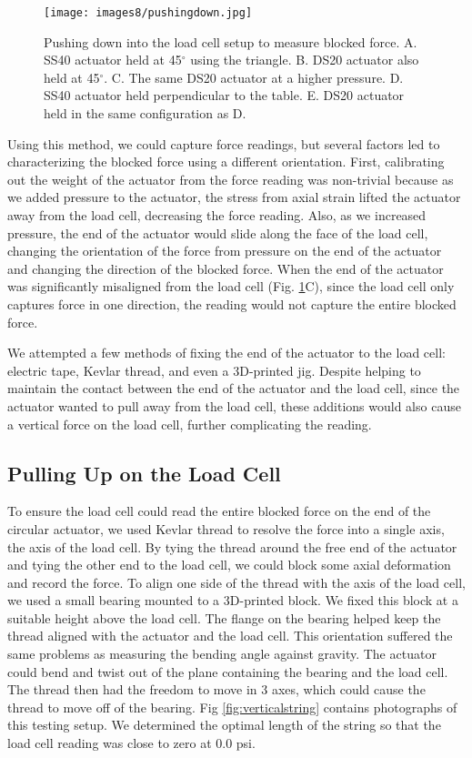 \begin{figure}[ht]
    \centering
     \texttt{[image: images8/pushingdown.jpg]}
    \caption{Pushing down into the load cell setup to measure blocked force. A. SS40 actuator held at 45$^\circ$ using the triangle. B. DS20 actuator also held at 45$^\circ$. C. The same DS20 actuator at a higher pressure. D. SS40 actuator held perpendicular to the table. E. DS20 actuator held in the same configuration as D.}
    \label{fig:pushingdown}
\end{figure}

Using this method, we could capture force readings, but several factors led to characterizing the blocked force using a different orientation. First, calibrating out the weight of the actuator from the force reading was non-trivial because as we added pressure to the actuator, the stress from axial strain lifted the actuator away from the load cell, decreasing the force reading. Also, as we increased pressure, the end of the actuator would slide along the face of the load cell, changing the orientation of the force from pressure on the end of the actuator and changing the direction of the blocked force. When the end of the actuator was significantly misaligned from the load cell (Fig. \ref{fig:pushingdown}C), since the load cell only captures force in one direction, the reading would not capture the entire blocked force. 

We attempted a few methods of fixing the end of the actuator to the load cell: electric tape, Kevlar thread, and even a 3D-printed jig. Despite helping to maintain the contact between the end of the actuator and the load cell, since the actuator wanted to pull away from the load cell, these additions would also cause a vertical force on the load cell, further complicating the reading. 

\subsection{Pulling Up on the Load Cell}

To ensure the load cell could read the entire blocked force on the end of the circular actuator, we used Kevlar thread to resolve the force into a single axis, the axis of the load cell. By tying the thread around the free end of the actuator and tying the other end to the load cell, we could block some axial deformation and record the force. To align one side of the thread with the axis of the load cell, we used a small bearing mounted to a 3D-printed block. We fixed this block at a suitable height above the load cell. The flange on the bearing helped keep the thread aligned with the actuator and the load cell. This orientation suffered the same problems as measuring the bending angle against gravity. The actuator could bend and twist out of the plane containing the bearing and the load cell. The thread then had the freedom to move in 3 axes, which could cause the thread to move off of the bearing. Fig \ref{fig:verticalstring} contains photographs of this testing setup. We determined the optimal length of the string so that the load cell reading was close to zero at 0.0 psi. 

